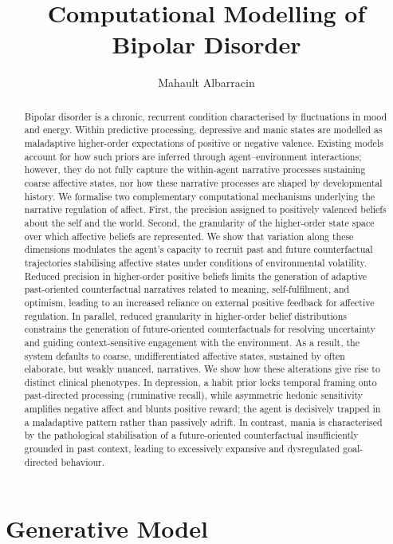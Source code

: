 \documentclass[11pt,a4paper]{article}
\title{Computational Modelling of Bipolar Disorder}
\author{Mahault Albarracin}
\date{}
\begin{document}
\maketitle

\begin{abstract}
Bipolar disorder is a chronic, recurrent condition characterised by fluctuations in mood and energy. Within predictive processing, depressive and manic states are modelled as maladaptive higher-order expectations of positive or negative valence. Existing models account for how such priors are inferred through agent--environment interactions; however, they do not fully capture the within-agent narrative processes sustaining coarse affective states, nor how these narrative processes are shaped by developmental history. We formalise two complementary computational mechanisms underlying the narrative regulation of affect. First, the precision assigned to positively valenced beliefs about the self and the world. Second, the granularity of the higher-order state space over which affective beliefs are represented. We show that variation along these dimensions modulates the agent's capacity to recruit past and future counterfactual trajectories stabilising affective states under conditions of environmental volatility. Reduced precision in higher-order positive beliefs limits the generation of adaptive past-oriented counterfactual narratives related to meaning, self-fulfilment, and optimism, leading to an increased reliance on external positive feedback for affective regulation. In parallel, reduced granularity in higher-order belief distributions constrains the generation of future-oriented counterfactuals for resolving uncertainty and guiding context-sensitive engagement with the environment. As a result, the system defaults to coarse, undifferentiated affective states, sustained by often elaborate, but weakly nuanced, narratives. We show how these alterations give rise to distinct clinical phenotypes. In depression, a habit prior locks temporal framing onto past-directed processing (ruminative recall), while asymmetric hedonic sensitivity amplifies negative affect and blunts positive reward; the agent is decisively trapped in a maladaptive pattern rather than passively adrift. In contrast, mania is characterised by the pathological stabilisation of a future-oriented counterfactual insufficiently grounded in past context, leading to excessively expansive and dysregulated goal-directed behaviour.
\end{abstract}


\section{Generative Model}\label{sec:model}
\end{document}
